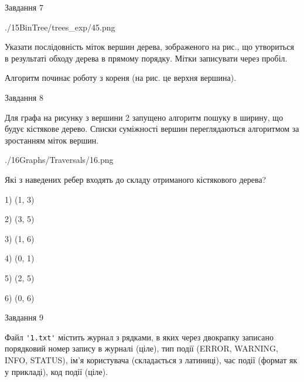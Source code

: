 \documentclass[12pt, ukrainian]{article}
\def\code#1{\Verb!#1!}
\begin{document}
{\vspace{10mm}\par

\newpage
\begin{minipage}[t]{9.7cm}
               
{\begin{center}Завдання {7}\end{center}}
\vspace{-6mm}

\begin{center}
	{./15BinTree/trees_exp/45.png}
\end{center}
Указати послідовність міток вершин дерева, зображеного на рис., що утвориться в результаті обходу дерева в прямому порядку. Мітки записувати через пробіл.\par Алгоритм починає роботу з кореня (на рис. це верхня вершина).\par

\end{minipage}
\vline \hspace{8mm}
\begin{minipage}[t]{8.0cm}
               
{\begin{center}Завдання {8}\end{center}}
\vspace{-6mm}
Для графа на рисунку з вершини 2 запущено алгоритм пошуку в ширину, що будує кістякове дерево. Списки суміжності вершин переглядаються алгоритмом за зростанням міток вершин.\par
\begin{center}
	{./16Graphs/Traversals/16.png}
\end{center}
\par Які з наведених ребер входять до складу отриманого кістякового дерева?\par
1) (1, 3)\par
2) (3, 5)\par
3) (1, 6)\par
4) (0, 1)\par
5) (2, 5)\par
6) (0, 6)\par
{\vskip 15pt} \par

\end{minipage}

               
{\begin{center}Завдання {9}\end{center}}
\vspace{-6mm}
Файл \code{'1.txt'} містить журнал з рядками, в яких через двокрапку записано поряд\-ко\-вий номер запису в журналі (ціле), тип події (ERROR, WARNING, INFO, STATUS), ім'я користувача (складається з латиниці), час події (фор\-мат як у прикладі), код події (ціле).

}
\end{document}
